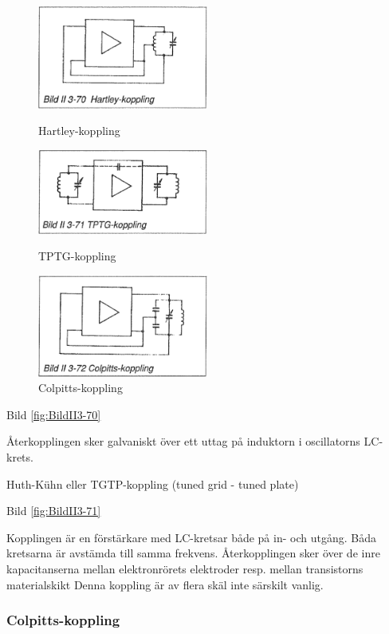 \begin{figure}
  \includegraphics[width=0.5\textwidth]{images/bild_2_3-70}
  \caption{Hartley-koppling}
  \label{fig:BildII3-70}

  \includegraphics[width=0.5\textwidth]{images/bild_2_3-71}
  \caption{TPTG-koppling}
  \label{fig:BildII3-71}

  \includegraphics[width=0.5\textwidth]{images/bild_2_3-72}
  \caption{Colpitts-koppling}
  \label{fig:BildII3-72}
\end{figure}

Bild \ref{fig:BildII3-70}

Återkopplingen sker galvaniskt över ett uttag på induktorn i
oscillatorns LC-krets.

Huth-Kühn eller TGTP-koppling (tuned grid - tuned plate)

Bild \ref{fig:BildII3-71}

Kopplingen är en förstärkare med LC-kretsar både på in- och
utgång. Båda kretsarna är avstämda till samma frekvens. Återkopplingen
sker över de inre kapacitanserna mellan elektronrörets elektroder
resp. mellan transistorns materialskikt Denna koppling är av flera
skäl inte särskilt vanlig.

\subsubsection{Colpitts-koppling}


